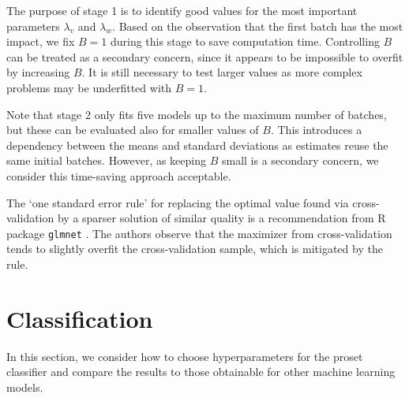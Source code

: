 %
The purpose of stage 1 is to identify good values for the most important parameters $\lambda_v$ and $\lambda_w$.
Based on the observation that the first batch has the most impact, we fix $B=1$ during this stage to save computation time.
Controlling $B$ can be treated as a secondary concern, since it appears to be impossible to overfit by increasing $B$.
It is still necessary to test larger values as more complex problems may be underfitted with $B=1$.\par
%
Note that stage 2 only fits five models up to the maximum number of batches, but these can be evaluated also for smaller values of $B$.
This introduces a dependency between the means and standard deviations as estimates reuse the same initial batches.
However, as keeping $B$ small is a secondary concern, we consider this time-saving approach acceptable.\par
%
The `one standard error rule' for replacing the optimal value found via cross-validation by a sparser solution of similar quality is a recommendation from R package \texttt{glmnet} \cite{Friedman_10}.
The authors observe that the maximizer from cross-validation tends to slightly overfit the cross-validation sample, which is mitigated by the rule.
%
\section{Classification}
\label{sec_classification}
%
In this section, we consider how to choose hyperparameters for the proset classifier and compare the results to those obtainable for other machine learning models.
%
